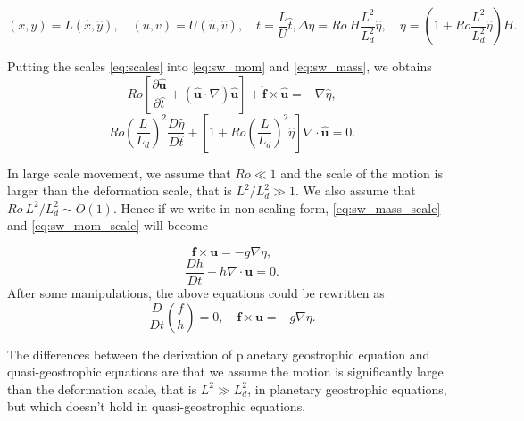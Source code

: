 \documentclass[a4paper]{article}
\begin{document}
\begin{enumerate}[label=\textbf{\arabic*.}]
\begin{enumerate}[label=\textbf{(\alph*)}]
		\begin{subequations}\label{eq:scales}
				\begin{equation}
					( x ,y ) = L ( \hat { x } ,\hat { y } ) ,\quad ( u ,v ) = U ( \hat { u } ,\hat { v } ), \quad t=\frac{L}{U}\hat{t},
				\end{equation}
				\begin{equation}
					\Delta \eta = Ro ~H \frac{L^2}{L_d^2} \hat{\eta}, \quad \eta = \left(1+Ro\frac{L^2}{L_d^2} \hat{\eta}\right)H.
				\end{equation}
		\end{subequations}

	Putting the scales \eqref{eq:scales} into \eqref{eq:sw_mom} and \eqref{eq:sw_mass}, we obtains
	\begin{equation}\label{eq:sw_mom_scale}
		Ro \left[ \frac { \partial \hat { \bm u } } { \partial \hat { t } } + ( \hat {  \bm u } \cdot \nabla ) \hat {  \bm u } \right] + \hat {  \bm f } \times \hat { \bm u } = - \nabla \hat { \eta },
	\end{equation}
	\begin{equation}\label{eq:sw_mass_scale}
		Ro \left( \frac { L } { L _ { d } } \right) ^ { 2} \frac { D \hat{ \eta } } { D \hat { t } } + \left[ 1+ R o \left( \frac { L } { L _ { d } } \right) ^ { 2} \hat { \eta } \right] \nabla \cdot\hat { \bm u } = 0.
	\end{equation}
	
	In large scale movement, we assume that	$Ro\ll 1$ and the scale of the motion is larger than the deformation scale, that is $L^2/L_d^2\gg 1$. We also assume that $Ro ~L^2/L_d^2 \sim O(1)$. Hence if we write in non-scaling form,  \eqref{eq:sw_mass_scale} and \eqref{eq:sw_mom_scale} will become 
	
	$$\bm f \times \bm u = - g \nabla \eta,$$
	$$\frac { D h } { D t } + h \nabla \cdot \bm u = 0.$$
	After some manipulations, the above equations could be rewritten as
	$$\frac{D }{Dt}\left(\frac{f}{h}\right)=0, \quad \bm f \times \bm u = - g \nabla \eta.$$
	\par
	The differences between the derivation of planetary geostrophic equation and quasi-geostrophic equations are that we assume the motion is significantly large than the deformation scale, that is $L^2\gg L^2_d$, in planetary geostrophic equations, but which doesn't hold in quasi-geostrophic equations.
	

\end{enumerate}
\end{enumerate}
\end{document}
